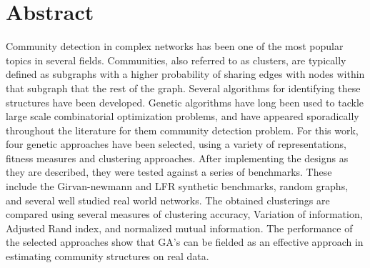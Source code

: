 \thispagestyle{empty}
\section{Abstract}

\begin{doublespace}
Community detection in complex networks has been one of the most popular topics in several fields. Communities, also referred to as clusters, are typically defined as subgraphs with a higher probability of sharing edges with nodes within that subgraph that the rest of the graph. Several algorithms for identifying these structures have been developed. Genetic algorithms have long been used to tackle large scale combinatorial optimization problems, and have appeared sporadically throughout the literature for them community detection problem. For this work, four genetic approaches have been selected, using a variety of representations, fitness measures and clustering approaches. After implementing the designs as they are described, they were tested against a series of benchmarks. These include the Girvan-newmann and LFR synthetic benchmarks, random graphs, and several well studied real world networks. The obtained clusterings are compared using several measures of clustering accuracy, Variation of information, Adjusted Rand index, and normalized mutual information. The performance of the selected approaches show that GA's can be fielded as an effective approach in estimating community structures on real data.
\end{doublespace}

